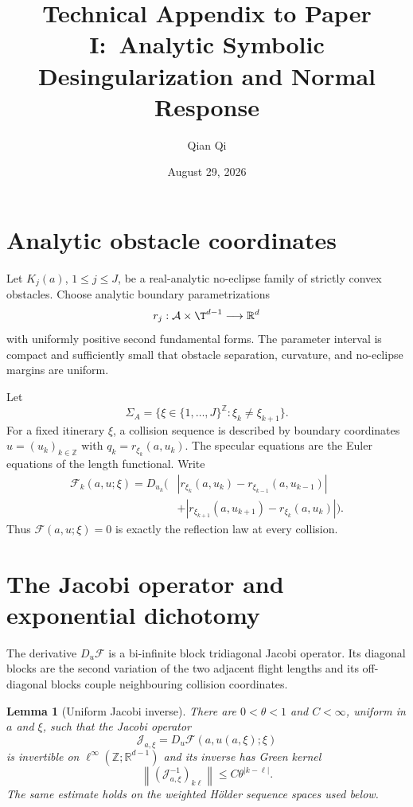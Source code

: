 \documentclass[11pt,reqno]{amsart}
\title{Technical Appendix to Paper I:\ Analytic Symbolic Desingularization and Normal Response}
\author{Qian Qi}
\date{August 29, 2026}
\newtheorem{lemma}[theorem]{Lemma}
\theoremstyle{definition}
\theoremstyle{remark}
\newcommand{\R}{\mathbb R}
\newcommand{\Z}{\mathbb Z}
\newcommand{\F}{\mathcal F}
\newcommand{\norm}[1]{\left\lVert#1\right\rVert}
\newcommand{\abs}[1]{\left\lvert#1\right\rvert}
\begin{document}
\maketitle

\section{Analytic obstacle coordinates}

Let $K_j(a)$, $1\le j\le J$, be a real-analytic no-eclipse family of strictly
convex obstacles.  Choose analytic boundary parametrizations
\[
 r_j:\mathcal A\times\T^{d-1}\longrightarrow\R^d
\]
with uniformly positive second fundamental forms.  The parameter interval is
compact and sufficiently small that obstacle separation, curvature, and
no-eclipse margins are uniform.

Let
\[
 \Sigma_A=\{\xi\in\{1,\ldots,J\}^{\Z}:\xi_k\ne\xi_{k+1}\}.
\]
For a fixed itinerary $\xi$, a collision sequence is described by boundary
coordinates $u=(u_k)_{k\in\Z}$ with
$q_k=r_{\xi_k}(a,u_k)$.  The specular equations are the Euler equations of the
length functional.  Write
\begin{align}
 \F_k(a,u;\xi)
 =D_{u_k}\Big(&\abs{r_{\xi_k}(a,u_k)-r_{\xi_{k-1}}(a,u_{k-1})}\\
 &+\abs{r_{\xi_{k+1}}(a,u_{k+1})-r_{\xi_k}(a,u_k)}\Big).
 \label{eq:reflection-equation}
\end{align}
Thus $\F(a,u;\xi)=0$ is exactly the reflection law at every collision.

\section{The Jacobi operator and exponential dichotomy}

The derivative $D_u\F$ is a bi-infinite block tridiagonal Jacobi operator.
Its diagonal blocks are the second variation of the two adjacent flight
lengths and its off-diagonal blocks couple neighbouring collision coordinates.

\begin{lemma}[Uniform Jacobi inverse]\label{lem:Jacobi}
There are $0<\theta<1$ and $C<\infty$, uniform in $a$ and $\xi$, such that the
Jacobi operator
\[
 \mathcal J_{a,\xi}=D_u\F(a,u(a,\xi);\xi)
\]
is invertible on $\ell^\infty(\Z;\R^{d-1})$ and its inverse has Green kernel
\[
 \norm{(\mathcal J_{a,\xi}^{-1})_{k\ell}}
 \le C\theta^{\abs{k-\ell}}.
 \label{eq:Green-decay}
\]
The same estimate holds on the weighted Hölder sequence spaces used below.
\end{lemma}
\end{document}
